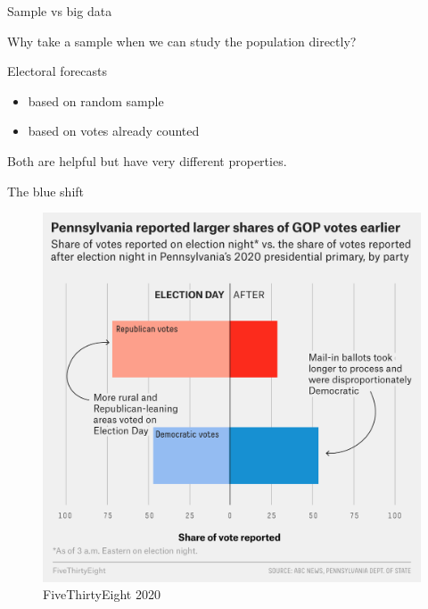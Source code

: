 \documentclass[ignorenonframetext,aspectratio=54,]{beamer}
\providecommand{\tightlist}{%
  \setlength{\itemsep}{0pt}\setlength{\parskip}{0pt}}
\begin{document}
\begin{frame}{Sample vs big data}
\protect\hypertarget{sample-vs-big-data}{}

Why take a sample when we can study the population directly?

\end{frame}

\begin{frame}{Electoral forecasts}
\protect\hypertarget{electoral-forecasts}{}

\begin{itemize}
\tightlist
\item
  based on random sample
\item
  based on votes already counted
\end{itemize}

Both are helpful but have very different properties.

\end{frame}

\begin{frame}{The blue shift}
\protect\hypertarget{the-blue-shift}{}

\begin{figure}
\centering
\includegraphics[width=\textwidth,height=0.8\textheight]{exhibit/fig/blue-shift.png}
\caption{FiveThirtyEight 2020}
\end{figure}

\end{frame}
\end{document}
